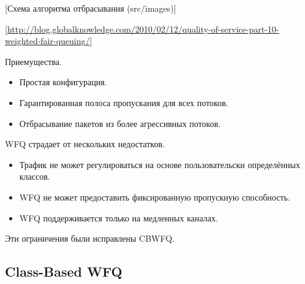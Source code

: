 	[Схема алгоритма отбрасывания (src/images)]

	[\url{http://blog.globalknowledge.com/2010/02/12/quality-of-service-part-10-weighted-fair-queuing/}]

	 
	Приемущества.
	\begin{itemize}
		\item Простая конфигурация.
		\item Гарантированная полоса пропускания для всех потоков.
		\item Отбрасывание пакетов из более агрессивных потоков.
	\end{itemize}

    WFQ страдает от нескольких недостатков.
	\begin{itemize}
    	\item  Трафик не может регулироваться на основе пользовательски определённых классов.
    	\item  WFQ не может предоставить фиксированную пропускную способность.
    	\item  WFQ поддерживается только на медленных каналах.
	\end{itemize}

    Эти ограничения были исправлены CBWFQ.

	\subsection{Class-Based WFQ}

